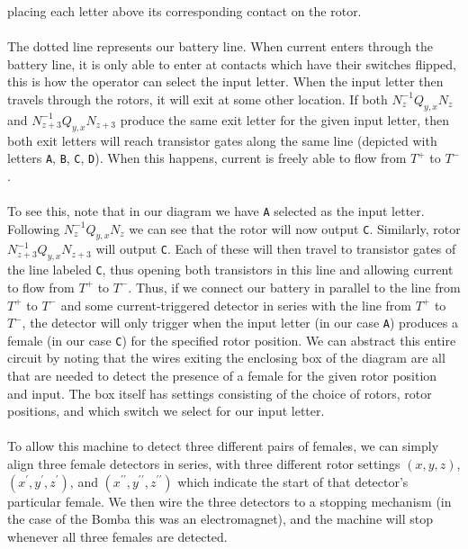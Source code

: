 placing each letter above its corresponding contact on the rotor.
\\\\The dotted line represents our battery
line. When current enters through the battery line, it is only able
to enter at contacts which have their switches flipped, this is how
the operator can select the input letter. When the input letter then
travels through the rotors, it will exit at some other location. If
both $N_z^{-1}Q_{y,x}N_z$ and $N_{z+3}^{-1}Q_{y,x}N_{z+3}$ produce
the same exit letter for the given input letter, then both exit
letters will reach transistor gates along the same line (depicted with
letters \texttt{A}, \texttt{B}, \texttt{C}, \texttt{D}). When this
happens, current is freely able to flow from $T^{+}$ to $T^{-}$.
\\\\To see this, note that in our diagram we have \texttt{A} selected
as the input letter. Following $N_z^{-1}Q_{y,x}N_z$ we can see that
the rotor will now output \texttt{C}. Similarly, rotor
$N_{z+3}^{-1}Q_{y,x}N_{z+3}$ will output \texttt{C}. Each of these
will then travel to transistor gates of the line labeled \texttt{C},
thus opening both transistors in this line and allowing current to
flow from $T^{+}$ to $T^{-}$.
Thus, if we connect our battery in parallel to the line from $T^{+}$
to $T^{-}$ and some current-triggered detector in series with the
line from $T^{+}$ to $T^{-}$, the detector will only trigger when the
input letter (in our case \texttt{A}) produces a female (in our case
\texttt{C}) for the specified rotor position. We can abstract this
entire circuit by noting that the wires exiting the enclosing box of
the diagram are all that are needed to detect the presence of a
female for the given rotor position and input. The box itself has
settings consisting of the choice of rotors, rotor positions, and
which switch we select for our input letter.
\\\\To allow this machine to detect three different pairs of females,
we can simply align three female detectors in series, with three
different rotor settings $(x,y,z)$, $(x^\prime, y^\prime, z^\prime)$,
and $(x^{\prime\prime}, y^{\prime\prime}, z^{\prime\prime})$ which
indicate the start of that detector's particular female. We then wire
the three detectors to a stopping mechanism (in the case of the Bomba
this was an electromagnet), and the machine will stop whenever all
three females are detected.

